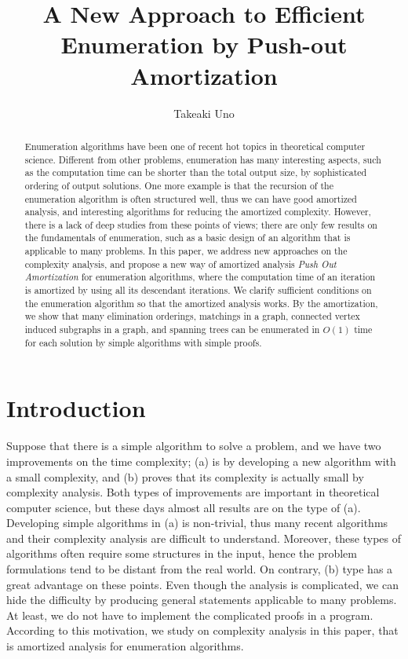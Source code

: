 \documentclass{llncs}
\title{A New Approach to Efficient Enumeration by Push-out Amortization}
\author{Takeaki Uno}
\institute{
\email{uno@nii.jp}, National Institute of Informatics, 
2-1-2, Hitotsubashi, Chiyoda-ku, Tokyo 101-8430, Japan
}
\begin{document}
\maketitle


\begin{abstract}
Enumeration algorithms have been one of recent hot topics in
 theoretical computer science.
Different from other problems, enumeration has many interesting aspects,
 such as the computation time can be shorter than the total output size,
 by sophisticated ordering of output solutions.
One more example is that the recursion of the enumeration algorithm is 
 often structured well, thus we can have good amortized analysis, and 
 interesting algorithms for reducing the amortized complexity.
However, there is a lack of deep studies from these points of views; there 
 are only few results on the fundamentals of enumeration, such as 
 a basic design of an algorithm that is applicable to many problems.
In this paper, we address new approaches on the complexity analysis,
 and propose a new way of amortized analysis {\it Push Out
 Amortization} for enumeration algorithms, where the computation time
 of an iteration is amortized by using all its descendant iterations.
We clarify sufficient conditions on the enumeration algorithm
 so that the amortized analysis works.
By the amortization, we show that many elimination orderings,
 matchings in a graph, connected vertex induced subgraphs in a graph,
 and spanning trees can be enumerated in $O(1)$ time for each
 solution by simple algorithms with simple proofs.
\end{abstract}




\vspace{-10mm}
\section{Introduction}
\vspace{-2mm}

Suppose that there is a simple algorithm to solve a problem, and we 
 have two improvements on the time complexity; (a) is by developing a 
 new algorithm with a small complexity, and (b) proves that its complexity 
 is actually small by complexity analysis.
Both types of improvements are important in theoretical computer science,
 but these days almost all results are on the type of (a).
Developing simple algorithms in (a) is non-trivial, thus many recent
 algorithms and their complexity analysis are difficult to understand.
Moreover, these types of algorithms often require some structures in the
 input, hence the problem formulations tend to be distant from the real world.
On contrary, (b) type has a great advantage on these points.
Even though the analysis is complicated, we can hide the difficulty by
 producing general statements applicable to many problems.
At least, we do not have to implement the complicated proofs in a program.
According to this motivation, we study on complexity analysis in this paper,
 that is amortized analysis for enumeration algorithms.
\end{document}
